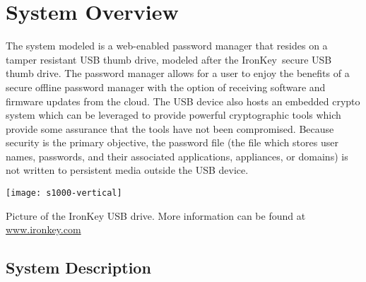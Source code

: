 \chapter{System Overview}
\label{ch:System Overview}
The system modeled is a web-enabled password manager that resides on a
tamper resistant USB thumb drive, modeled after the
IronKey\texttrademark~secure USB thumb drive. The password manager
allows for a user to enjoy the benefits of a secure offline password
manager with the option of receiving software and firmware updates from the
cloud. The USB device also hosts an embedded crypto system which can be
leveraged to provide powerful cryptographic tools which provide some assurance
that the tools have not been compromised. Because security is the
primary objective, the password file (the file which stores user
names, passwords, and their associated applications, appliances, or
domains) is not written to persistent media outside the USB device.

\begin{marginfigure}%
\centering
  \texttt{[image: s1000-vertical]}
  \caption{Picture of the IronKey USB drive.  More information can be
found at \url{www.ironkey.com}}
  \label{fig:ik}
\end{marginfigure}



\section{System Description}
\label{sec:sysdesc}

